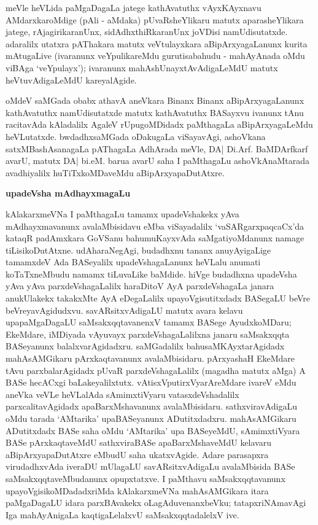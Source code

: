 meVle heVLida paMgaDagaLa jatege kathAvatuthx vAyxKAyxnavu AMdarxkaroMdige (pAli - aMdaka) pUvaRsheYlikaru matutx aparasheYlikara jatege, rAjagirikaranUnx, sidAdhxthiRkaranUnx joVDisi namUdisutatxde. adaralilx utatxra pAThakara matutx veVtulayxkara aBipArxyagaLanunx kurita mAtugaLive (ivaranunx veYpulikareMdu gurutisabahudu - mahAyAnada oMdu viBAga `veYpulayx'); ivaranunx mahAshUnayxtAvAdigaLeMdU matutx heVtuvAdigaLeMdU kareyalAgide.

oMdeV saMGada obabx athavA aneVkara Binanx Binanx aBipArxyagaLanunx kathAvatuthx namUdisutatxde matutx kathAvatuthx BASayxvu ivanunx tAnu racitavAda kAladalilx AgaleV rUpugoMDidadx paMthagaLa aBipArxyagaLeMdu heVLutatxde. bwdadhxsaMGada oDakugaLa viSayavAgi, ashoVkana satxMBashAsanagaLa pAThagaLa AdhArada meVle, DA| Di.Arf. BaMDArfkarf avarU, matutx DA| bi.eM. barua avarU saha I paMthagaLu ashoVkAnaMtarada avadhiyalilx huTiTxkoMDaveMdu aBipArxyapaDutAtxre.

\begin{center}
{\textbf{\Large upadeVsha mAdhayxmagaLu}}
\end{center}

kAlakarxmeVNa I paMthagaLu tamamx upadeVshakekx yAva mAdhayxmavanunx avalaMbisi\-davu eMba viSayadalilx `vaSARgarxpaqcaCx'da kataqR padAmxkara GoVSanu bahumuKayx\-vAda saMgatiyoMdanunx namage tiLisikoDutAtxne. udAharaNegAgi, budadhxnu tananx anu\-yAyigaLige tamamxdeV Ada BASeyalilx upadeVshagaLanunx heVLalu anumati koTaTx\-neMbudu namamx tiLuvaLike baMdide. hiVge budadhxna upadeVsha yAva yAva parxdeVsha\-gaLalilx haraDitoV AyA parxdeVshagaLa janara anukUlakekx takakxMte AyA eDegaLalilx upa\-yoVgisutitxdadx BASegaLU beVre beVreyavAgidudxvu. savARsitxvAdigaLU matutx avara kelavu upapaMgaDagaLU saMsakxqqtavanenxV tamamx BASege AyudxkoMDaru; EkeMdare, iMDiyada vAyuvayx parxdeVshagaLalilxna janaru saMsakxqqta BASeyanunx balalxvarAgidadxru. saMGadalilx bahusaMKAyxtarAgidadx mahAsAMGikaru pArxkaqtavanunx avalaMbisidaru. pArxyashaH EkeMdare tAvu parxbalarAgidadx pUvaR parxdeVshagaLalilx (magadha matutx aMga) A BASe hecACxgi baLakeyalilxtutx. vAtisxVputirxVyarAreMdare ivareV eMdu aneVka veVLe heVLalAda sAmimxtiVyaru vatasxdeVshadalilx parxcalitavAgidadx apaBarxMshavanunx avalaMbi\-si\-daru. sathxviravAdigaLu oMdu tarada `AMtarika' upaBASeyanunx ADutitxdadxru. mahA\-sAMGikaru ADutitxdadx BASe saha oMdu `AMtarika' upa BASeyeMdU, sAmimxtiVyara BASe pArxkaqtaveMdU sathxviraBASe apaBarxMshaveMdU kelavaru aBi\-pArxya\-paDutAtxre eMbudU saha ukatxvAgide. Adare parasapxra virudadhxvAda iveraDU mUlagaLU savARsitxvAdigaLu avalaMbisida BASe saMsakxqqtaveMbudanunx opupxtatxve. I paMthavu saMsakxqqta\-vanunx upayoVgisikoMDadadxriMda kAlakarxmeVNa mahAsAMGikara itara paMgaDagaLU idara parxBAvakekx oLagAduvenanxbeVku; tatapxriNAmavAgi Iga mahAyAnigaLa kaqtigaLe\-lalxvU saMsakxqqtadalelxV ive.

